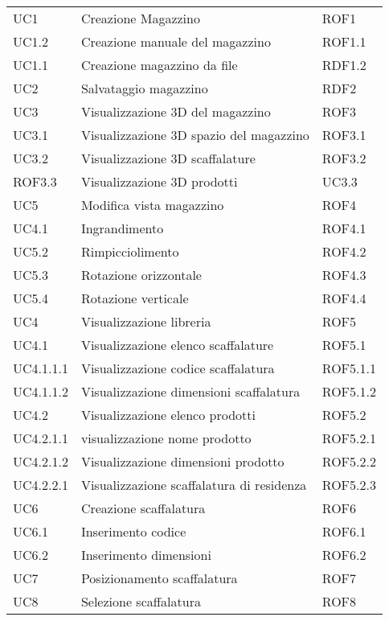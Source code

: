 \begin{xltabular}{\textwidth}{ p{0.3\textwidth} | X | p{0.2\textwidth} }
    UC1 & Creazione Magazzino & ROF1\\
    UC1.2 & Creazione manuale del magazzino & ROF1.1\\
    UC1.1 & Creazione magazzino da file & RDF1.2\\
    UC2 & Salvataggio magazzino & RDF2\\
    UC3 & Visualizzazione 3D del magazzino & ROF3\\
    UC3.1 & Visualizzazione 3D spazio del magazzino & ROF3.1\\
    UC3.2 & Visualizzazione 3D scaffalature & ROF3.2\\
    ROF3.3 & Visualizzazione 3D prodotti & UC3.3\\
    UC5 & Modifica vista magazzino & ROF4\\
    UC4.1 & Ingrandimento & ROF4.1\\ 
    UC5.2 & Rimpicciolimento & ROF4.2\\ 
    UC5.3 & Rotazione orizzontale & ROF4.3\\ 
    UC5.4 & Rotazione verticale & ROF4.4\\ 
    UC4 & Visualizzazione libreria & ROF5\\ 
    UC4.1 & Visualizzazione elenco scaffalature & ROF5.1\\ 
    UC4.1.1.1 & Visualizzazione codice scaffalatura & ROF5.1.1\\
    UC4.1.1.2 & Visualizzazione dimensioni scaffalatura & ROF5.1.2\\
    UC4.2 & Visualizzazione elenco prodotti & ROF5.2\\ 
    UC4.2.1.1 & visualizzazione nome prodotto & ROF5.2.1\\
    UC4.2.1.2 & Visualizzazione dimensioni prodotto & ROF5.2.2\\
    UC4.2.2.1 & Visualizzazione scaffalatura di residenza & ROF5.2.3\\ 
    UC6 & Creazione scaffalatura & ROF6\\
    UC6.1 & Inserimento codice & ROF6.1\\
    UC6.2 & Inserimento dimensioni & ROF6.2\\
    UC7 & Posizionamento scaffalatura & ROF7\\
    UC8 & Selezione scaffalatura & ROF8\\

\end{xltabular}
